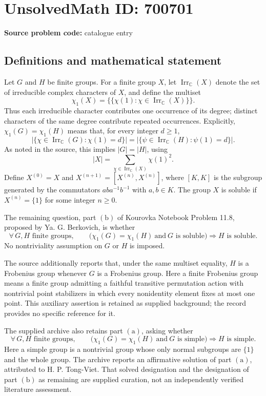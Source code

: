 \documentclass[11pt]{article}
\newcommand{\C}{\mathbb{C}}
\begin{document}
\section*{UnsolvedMath ID: 700701}
\textbf{Source problem code:} catalogue entry
\subsection{Definitions and mathematical statement}
Let \(G\) and \(H\) be finite groups. For a finite group \(X\), let \(\operatorname{Irr}_{\C}(X)\) denote the set of irreducible complex characters of \(X\), and define the multiset
\[
\chi_1(X)=\{\!\{\chi(1):\chi\in\operatorname{Irr}_{\C}(X)\}\!\}.
\]
Thus each irreducible character contributes one occurrence of its degree; distinct characters of the same degree contribute repeated occurrences. Explicitly, \(\chi_1(G)=\chi_1(H)\) means that, for every integer \(d\geq 1\),
\[
\bigl|\{\chi\in\operatorname{Irr}_{\C}(G):\chi(1)=d\}\bigr|
=
\bigl|\{\psi\in\operatorname{Irr}_{\C}(H):\psi(1)=d\}\bigr|.
\]
As noted in the source, this implies \(|G|=|H|\), using
\[
|X|=\sum_{\chi\in\operatorname{Irr}_{\C}(X)}\chi(1)^2.
\]
Define \(X^{(0)}=X\) and \(X^{(n+1)}=[X^{(n)},X^{(n)}]\), where \([K,K]\) is the subgroup generated by the commutators \(aba^{-1}b^{-1}\) with \(a,b\in K\). The group \(X\) is soluble if \(X^{(n)}=\{1\}\) for some integer \(n\geq 0\).

The remaining question, part \(\mathrm{(b)}\) of Kourovka Notebook Problem 11.8, proposed by Ya. G. Berkovich, is whether
\[
\forall\,G,H\text{ finite groups},\qquad
\bigl(\chi_1(G)=\chi_1(H)\ \text{and}\ G\text{ is soluble}\bigr)
\Longrightarrow H\text{ is soluble}.
\]
No nontriviality assumption on \(G\) or \(H\) is imposed.

The source additionally reports that, under the same multiset equality, \(H\) is a Frobenius group whenever \(G\) is a Frobenius group. Here a finite Frobenius group means a finite group admitting a faithful transitive permutation action with nontrivial point stabilizers in which every nonidentity element fixes at most one point. This auxiliary assertion is retained as supplied background; the record provides no specific reference for it.

The supplied archive also retains part \(\mathrm{(a)}\), asking whether
\[
\forall\,G,H\text{ finite groups},\qquad
\bigl(\chi_1(G)=\chi_1(H)\ \text{and}\ G\text{ is simple}\bigr)
\Longrightarrow H\text{ is simple}.
\]
Here a simple group is a nontrivial group whose only normal subgroups are \(\{1\}\) and the whole group. The archive reports an affirmative solution of part \(\mathrm{(a)}\), attributed to H. P. Tong-Viet. That solved designation and the designation of part \(\mathrm{(b)}\) as remaining are supplied curation, not an independently verified literature assessment.
\end{document}
